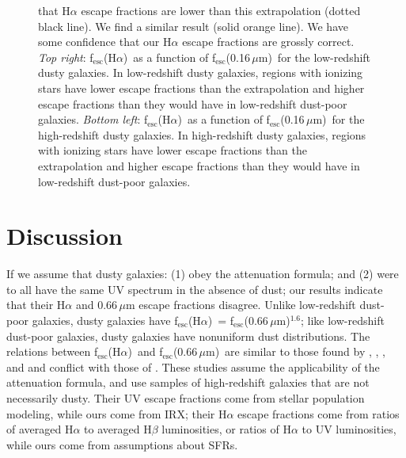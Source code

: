 \documentclass[referee]{aa}
\newcommand{\alephuv}{f$_{\mathrm{esc}}$(0.16$\,\mu$m)}
\newcommand{\alephha}{f$_{\mathrm{esc}}$(H$\alpha$)}
\newcommand{\alephuvha}{f$_{\mathrm{esc}}$(0.66$\,\mu$m)}
\begin{document}
\begin{figure}[!ht]
{{that H$\alpha$ escape fractions are lower than this extrapolation (dotted black
line).  We find a similar result (solid orange line).
We have some confidence that our H$\alpha$ escape fractions are grossly
correct.
\emph{Top right}:  \alephha~as a function of \alephuv~for the low-redshift dusty
galaxies.  In
low-redshift dusty galaxies, regions with ionizing stars have lower
escape fractions than the extrapolation and higher escape fractions than they
would have in low-redshift dust-poor galaxies.
\emph{Bottom left}:  \alephha~as a function of \alephuv~for the high-redshift
dusty galaxies.  In high-redshift dusty galaxies,
regions with ionizing stars have
lower escape fractions than the extrapolation and higher escape fractions than
they would have in low-redshift dust-poor galaxies.\label{fha_fuv}}}
\end{figure}

\section{Discussion}\label{sec:discuss}

If we assume that dusty galaxies: (1) obey the \citet{calzetti00} attenuation
formula; and (2) were to all have the same UV spectrum in the absence of dust;
our results indicate that their H$\alpha$ and 0.66$\,\mu$m escape
fractions disagree.  Unlike low-redshift dust-poor galaxies, dusty galaxies
have \alephha~= \alephuvha$^{1.6}$; like low-redshift dust-poor galaxies,
dusty galaxies have nonuniform dust distributions.  The relations between
\alephha~and \alephuvha~are similar to those found by \citet{onodera10},
\citet{kashino13}, \citet{price13}, and \citet{reddy15} and conflict with those of
\citet{erb06}.  These studies assume the applicability of the \citet{calzetti00}
attenuation
formula, and use samples of high-redshift galaxies that are not necessarily
dusty.  Their UV escape fractions come from stellar population modeling, while
ours come from IRX; their H$\alpha$ escape fractions come from ratios of
averaged H$\alpha$ to averaged H$\beta$ luminosities, or ratios of H$\alpha$ to
UV luminosities, while ours come from assumptions about SFRs.
\end{document}
